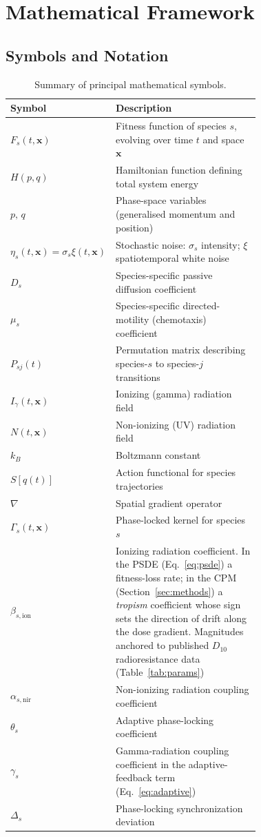 \documentclass[11pt]{article}
\begin{document}
\section{Mathematical Framework}

\subsection{Symbols and Notation}

\begin{table}[h!]
\centering
\small
\caption{Summary of principal mathematical symbols.}
\label{tab:notation}
\begin{tabular}{@{}lp{0.72\linewidth}@{}}
\toprule
\textbf{Symbol} & \textbf{Description} \\
\midrule
$F_s(t,\mathbf{x})$ & Fitness function of species $s$, evolving over time $t$ and space $\mathbf{x}$ \\
$H(p,q)$            & Hamiltonian function defining total system energy \\
$p,\,q$             & Phase-space variables (generalised momentum and position) \\
$\eta_s(t,\mathbf{x}) = \sigma_s\xi(t,\mathbf{x})$ & Stochastic noise: $\sigma_s$ intensity; $\xi$ spatiotemporal white noise \\
$D_s$               & Species-specific passive diffusion coefficient \\
$\mu_s$             & Species-specific directed-motility (chemotaxis) coefficient \\
$P_{sj}(t)$         & Permutation matrix describing species-$s$ to species-$j$ transitions \\
$I_\gamma(t,\mathbf{x})$ & Ionizing (gamma) radiation field \\
$N(t,\mathbf{x})$   & Non-ionizing (UV) radiation field \\
$k_B$               & Boltzmann constant \\
$S[q(t)]$           & Action functional for species trajectories \\
$\nabla$            & Spatial gradient operator \\
$\Gamma_s(t,\mathbf{x})$ & Phase-locked kernel for species $s$ \\
$\beta_{s,\mathrm{ion}}$ & Ionizing radiation coefficient. In the PSDE (Eq.~\ref{eq:psde}) a fitness-loss rate; in the CPM (Section~\ref{sec:methods}) a \emph{tropism} coefficient whose sign sets the direction of drift along the dose gradient. Magnitudes anchored to published $D_{10}$ radioresistance data (Table~\ref{tab:params}) \\
$\alpha_{s,\mathrm{nir}}$ & Non-ionizing radiation coupling coefficient \\
$\theta_s$          & Adaptive phase-locking coefficient \\
$\gamma_s$          & Gamma-radiation coupling coefficient in the adaptive-feedback term (Eq.~\ref{eq:adaptive}) \\
$\Delta_s$          & Phase-locking synchronization deviation \\
\bottomrule
\end{tabular}
\end{table}
\end{document}
